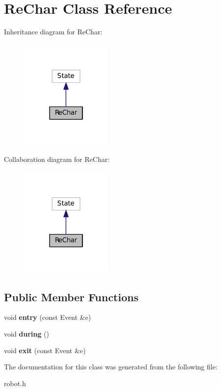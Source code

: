 \hypertarget{classReChar}{\section{Re\+Char Class Reference}
\label{classReChar}
}


Inheritance diagram for Re\+Char\+:
\nopagebreak
\begin{figure}[H]
\begin{center}
\leavevmode
\includegraphics[width=130pt]{classReChar__inherit__graph}
\end{center}
\end{figure}


Collaboration diagram for Re\+Char\+:
\nopagebreak
\begin{figure}[H]
\begin{center}
\leavevmode
\includegraphics[width=130pt]{classReChar__coll__graph}
\end{center}
\end{figure}
\subsection*{Public Member Functions}
\begin{DoxyCompactItemize}
\item 
\hypertarget{classReChar_a0f36c7acbe46cc2a9e7907d1555e255c}{void {\bfseries entry} (const Event \&e)}\label{classReChar_a0f36c7acbe46cc2a9e7907d1555e255c}

\item 
\hypertarget{classReChar_a7d1f1896d9b2dcf3c74ec244f404be02}{void {\bfseries during} ()}\label{classReChar_a7d1f1896d9b2dcf3c74ec244f404be02}

\item 
\hypertarget{classReChar_afdee4daa56738277b0e29ef220cbb870}{void {\bfseries exit} (const Event \&e)}\label{classReChar_afdee4daa56738277b0e29ef220cbb870}

\end{DoxyCompactItemize}


The documentation for this class was generated from the following file\+:\begin{DoxyCompactItemize}
\item 
robot.\+h\end{DoxyCompactItemize}
